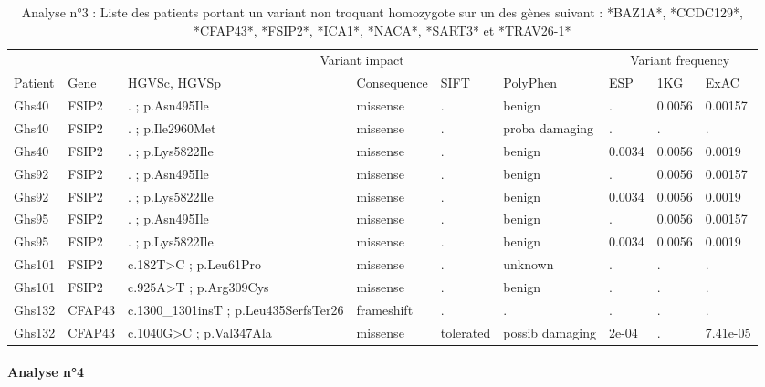 \documentclass[12pt,twoside]{reedthesis}
\theoremstyle{definition}
\theoremstyle{definition}
\theoremstyle{remark}
\begin{document}
  \begin{landscape}
  \begin{longtable}[t]{llp{11em}llllll}
  \caption{\label{tab:tabgrp2low}Analyse n°3 : Liste des patients portant un variant non troquant homozygote sur un des gènes suivant : *BAZ1A*, *CCDC129*, *CFAP43*, *FSIP2*, *ICA1*, *NACA*, *SART3*  et  *TRAV26-1*}\\
  \toprule
  \multicolumn{1}{c}{ } & \multicolumn{1}{c}{ } & \multicolumn{4}{c}{Variant impact} & \multicolumn{3}{c}{Variant frequency} \\
  \cmidrule(l{2pt}r{2pt}){3-6} \cmidrule(l{2pt}r{2pt}){7-9}
  Patient & Gene & HGVSc, HGVSp & Consequence & SIFT & PolyPhen & ESP & 1KG & ExAC\\
  \midrule
  Ghs40 & FSIP2 & . ; p.Asn495Ile & missense & . & benign & . & 0.0056 & 0.00157\\
  Ghs40 & FSIP2 & . ; p.Ile2960Met & missense & . & proba damaging & . & . & .\\
  Ghs40 & FSIP2 & . ; p.Lys5822Ile & missense & . & benign & 0.0034 & 0.0056 & 0.0019\\
  Ghs92 & FSIP2 & . ; p.Asn495Ile & missense & . & benign & . & 0.0056 & 0.00157\\
  Ghs92 & FSIP2 & . ; p.Lys5822Ile & missense & . & benign & 0.0034 & 0.0056 & 0.0019\\
  \addlinespace
  Ghs95 & FSIP2 & . ; p.Asn495Ile & missense & . & benign & . & 0.0056 & 0.00157\\
  Ghs95 & FSIP2 & . ; p.Lys5822Ile & missense & . & benign & 0.0034 & 0.0056 & 0.0019\\
  Ghs101 & FSIP2 & c.182T>C ; p.Leu61Pro & missense & . & unknown & . & . & .\\
  Ghs101 & FSIP2 & c.925A>T ; p.Arg309Cys & missense & . & benign & . & . & .\\
  Ghs132 & CFAP43 & c.1300\_1301insT ; p.Leu435SerfsTer26 & frameshift & . & . & . & . & .\\
  Ghs132 & CFAP43 & c.1040G>C ; p.Val347Ala & missense & tolerated & possib damaging & 2e-04 & . & 7.41e-05\\
  \bottomrule
  \end{longtable}
  \end{landscape}
  
  \newpage
  
  \paragraph{Analyse n°4}\label{analyse-n4}
  
\end{document}
